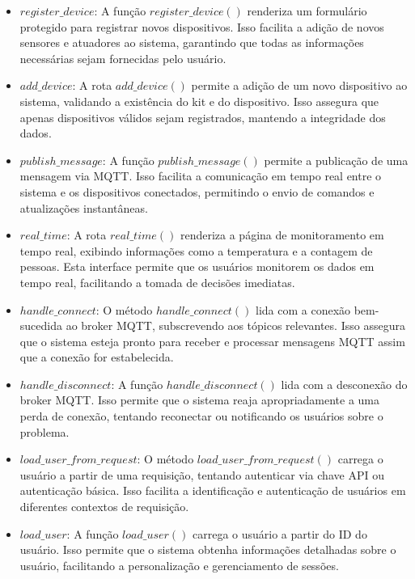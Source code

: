 \documentclass[conference, a4paper, 12pt]{IEEEtran}
\begin{document}
\begin{itemize}
          \item $register\_device$: A função $register\_device()$ renderiza um formulário protegido para registrar novos dispositivos. Isso facilita a adição de novos sensores e atuadores ao sistema, garantindo que todas as informações necessárias sejam fornecidas pelo usuário.
      
          \item $add\_device$: A rota $add\_device()$ permite a adição de um novo dispositivo ao sistema, validando a existência do kit e do dispositivo. Isso assegura que apenas dispositivos válidos sejam registrados, mantendo a integridade dos dados.
      
          \item $publish\_message$: A função $publish\_message()$ permite a publicação de uma mensagem via MQTT. Isso facilita a comunicação em tempo real entre o sistema e os dispositivos conectados, permitindo o envio de comandos e atualizações instantâneas.
      
          \item $real\_time$: A rota $real\_time()$ renderiza a página de monitoramento em tempo real, exibindo informações como a temperatura e a contagem de pessoas. Esta interface permite que os usuários monitorem os dados em tempo real, facilitando a tomada de decisões imediatas.
      
          \item $handle\_connect$: O método $handle\_connect()$ lida com a conexão bem-sucedida ao broker MQTT, subscrevendo aos tópicos relevantes. Isso assegura que o sistema esteja pronto para receber e processar mensagens MQTT assim que a conexão for estabelecida.
      
          \item $handle\_disconnect$: A função $handle\_disconnect()$ lida com a desconexão do broker MQTT. Isso permite que o sistema reaja apropriadamente a uma perda de conexão, tentando reconectar ou notificando os usuários sobre o problema.
      
          \item $load\_user\_from\_request$: O método $load\_user\_from\_request()$ carrega o usuário a partir de uma requisição, tentando autenticar via chave API ou autenticação básica. Isso facilita a identificação e autenticação de usuários em diferentes contextos de requisição.
      
          \item $load\_user$: A função $load\_user()$ carrega o usuário a partir do ID do usuário. Isso permite que o sistema obtenha informações detalhadas sobre o usuário, facilitando a personalização e gerenciamento de sessões.
      \end{itemize}
      
\end{document}
